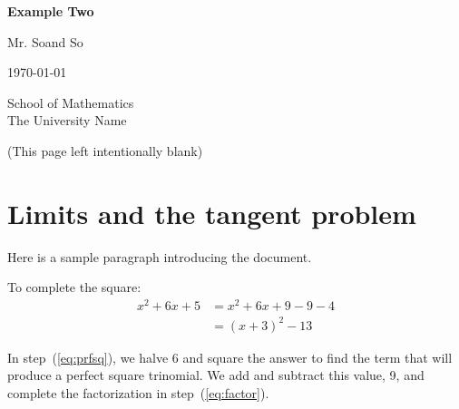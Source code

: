 \documentclass[12pt,twoside]{report}
\begin{document}
\pagestyle{empty}

\begin{titlepage}
	\centering
	\vspace*{3cm}

	{\Huge\bfseries Example Two\par}
	\vspace{1.5cm}

	{\Large Mr. Soand So\par}
	\vspace{0.5cm}

	{\large \today\par}
	\vfill

	{\small School of Mathematics\\
		The University Name}
\end{titlepage}

\vspace*{\fill}
\begin{center}
	{ \small (This page left intentionally blank) }
\end{center}
\vfill

\cleardoublepage

\pagestyle{fancy}

\section{Limits and the tangent problem}

Here is a sample paragraph introducing the document.

\begin{example}
	To complete the square:
	\begin{align}
		x^2 + 6x + 5
		 & = x^2 + 6x + 9 - 9 - 4 \label{eq:prfsq} \\
		 & = (x + 3)^2 - 13 \label{eq:factor}
	\end{align}

	In step~(\ref{eq:prfsq}), we halve 6 and square the answer to find the term that will produce a perfect square trinomial.
	We add and subtract this value, 9, and complete the factorization in step~(\ref{eq:factor}).

\end{example}
\end{document}
